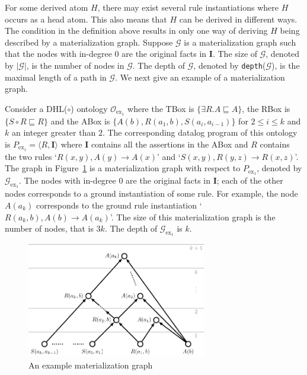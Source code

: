 For some derived atom $H$, there may exist several rule instantiations where $H$
occurs as a head atom.
This also means that $H$ can be derived in different ways.
The condition in the definition above results in only one way of deriving $H$ being
described by a materialization graph.
Suppose $\mathcal{G}$ is a materialization graph such that the nodes
with in-degree 0 are the
original facts in $\textbf{I}$.
The size of $\mathcal{G}$, denoted by $|\mathcal{G}|$, is the number of nodes in $\mathcal{G}$.
The depth of $\mathcal{G}$, denoted by \texttt{depth}($\mathcal{G}$), is the maximal length of a path
in $\mathcal{G}$.
We next give an example of a materialization graph.\\

\begin{example}\label{exp:mg}
Consider a DHL($\circ$) ontology $\mathcal{O}_{\text{ex}_1}$ where the TBox is
$\{\exists R.A\sqsubseteq A\}$, the RBox is $\{S\circ R\sqsubseteq R\}$ and
the ABox is $\{A(b),R(a_1,b),S(a_i,a_{i-1})\}$ for $2\leq i\leq k$ and
$k$ an integer greater than $2$.
The corresponding datalog program of this ontology is $P_{\text{ex}_1}=\langle R, \textbf{I}\rangle$
where $\textbf{I}$ contains all the assertions in the ABox
and $R$ contains the two rules `$R(x,y),A(y)\rightarrow A(x)$'
and `$S(x,y),R(y,z)\rightarrow R(x,z)$'.
The graph in Figure~\ref{fig:mg} is a materialization graph with respect to $P_{\text{ex}_1}$,
denoted by $\mathcal{G}_{\text{ex}_1}$.
The nodes with in-degree 0 are the original facts in $\textbf{I}$;
each of the other nodes corresponds to a ground instantiation of some rule.
For example, the node $A(a_k)$ corresponds to the ground rule instantiation
`$R(a_k,b),A(b)\rightarrow A(a_k)$'.
The size of this materialization graph is the number of nodes, that is $3k$.
The depth of $\mathcal{G}_{\text{ex}_1}$ is $k$.
\end{example}

\begin{figure}[htbp]
\begin{center}
\includegraphics[width=0.7\textwidth]{fig-mg.pdf}
\caption{An example materialization graph}
\label{fig:mg}
\end{center}
\end{figure}

